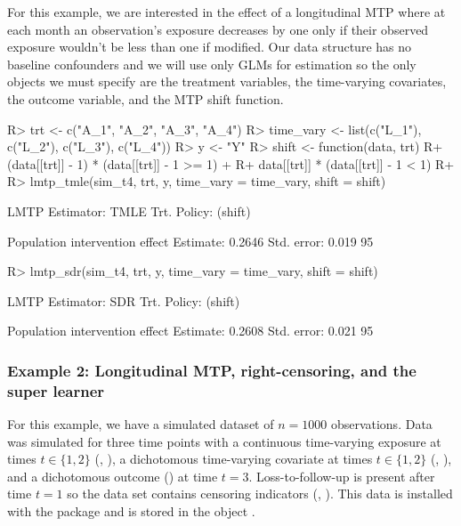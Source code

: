 \documentclass[]{jss}
\begin{document}
For this example, we are interested in the effect of a longitudinal MTP
where at each month an observation's exposure decreases by one only if
their observed exposure wouldn't be less than one if modified. Our data
structure has no baseline confounders and we will use only GLMs for
estimation so the only objects we must specify are the treatment
variables, the time-varying covariates, the outcome variable, and the
MTP shift function.

\begin{CodeChunk}

\begin{CodeInput}
R> trt <- c("A_1", "A_2", "A_3", "A_4")
R> time_vary <- list(c("L_1"), c("L_2"), c("L_3"), c("L_4"))
R> y <- "Y"
R> shift <- function(data, trt) {
R+   (data[[trt]] - 1) * (data[[trt]] - 1 >= 1) + 
R+     data[[trt]] * (data[[trt]] - 1 < 1)
R+ }
R> lmtp_tmle(sim_t4, trt, y, time_vary = time_vary, shift = shift)
\end{CodeInput}

\begin{CodeOutput}
LMTP Estimator: TMLE
   Trt. Policy: (shift)

Population intervention effect
      Estimate: 0.2646
    Std. error: 0.019
        95%
\end{CodeOutput}

\begin{CodeInput}
R> lmtp_sdr(sim_t4, trt, y, time_vary = time_vary, shift = shift)
\end{CodeInput}

\begin{CodeOutput}
LMTP Estimator: SDR
   Trt. Policy: (shift)

Population intervention effect
      Estimate: 0.2608
    Std. error: 0.021
        95%
\end{CodeOutput}

\end{CodeChunk}

\hypertarget{example-2-longitudinal-mtp-right-censoring-and-the-super-learner}{%
\subsubsection{Example 2: Longitudinal MTP, right-censoring, and the
super
learner}\label{example-2-longitudinal-mtp-right-censoring-and-the-super-learner}}

For this
example, we have a simulated dataset of \(n = 1000\) observations. Data
was simulated for three time points with a continuous time-varying
exposure at times \(t \in \{1, 2\}\) (, ), a
dichotomous time-varying covariate at times \(t \in \{1, 2\}\)
(, ), and a dichotomous outcome () at time
\(t = 3\). Loss-to-follow-up is present after time \(t = 1\) so the data set
contains censoring indicators (, ). This data is
installed with the package and is stored in the object .
\end{document}

